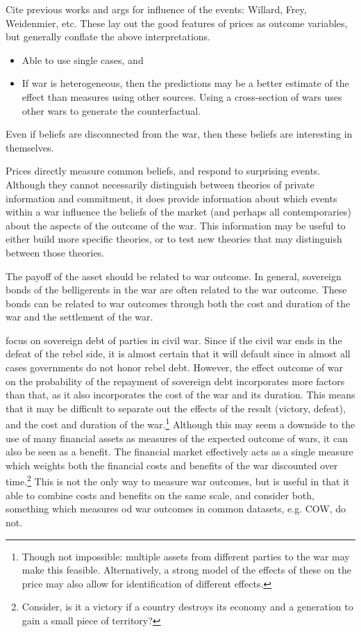 Cite previous works and args for influence of the events: Willard, Frey, Weidenmier, etc.
These lay out the good features of prices as outcome variables, but  generally conflate the above interpretations.

\begin{itemize}
\item Able to use single cases, and
\item If war is heterogeneous, then the predictions may be a better estimate of the effect than measures using other sources.
  Using a cross-section of wars uses other wars to generate the counterfactual.
\end{itemize}
Even if beliefs are disconnected from the war, then these beliefs are interesting in themselves.

Prices directly measure common beliefs, and respond to surprising events.
Although they cannot necessarily distinguish between theories of private information and commitment, it does provide information about which events within a war influence the beliefs of the market (and perhaps all contemporaries) about the aspects of the outcome of the war.
This information may be useful to either build more specific theories, or to test new theories that may distinguish between those theories.

The payoff of the asset should be related to war outcome.
In general, sovereign bonds of the belligerents in the war are often related to the war outcome.
These bonds can be related to war outcomes through both the cost and duration of the war and the settlement of the war.

\textcite{HaberMitchenerOosterlinckEtAl2015} focus on sovereign debt of parties in civil war.
Since if the civil war ends in the defeat of the rebel side, it is almost certain that it will default since in almost all cases governments do not honor rebel debt.
However, the effect outcome of war on the probability of the repayment of sovereign debt incorporates more factors than that, as it also incorporates the cost of the war and its duration.
This means that it may be difficult to separate out the effects of the result (victory, defeat), and the cost and duration of the war.\footnote{
  Though not impossible: multiple assets from different parties to the war may make this feasible.
  Alternatively, a strong model of the effects of these on the price may also allow for identification of different effects.
}
Although this may seem a downside to the use of many financial assets as measures of the expected outcome of wars, it can also be seen as a benefit.
The financial market effectively acts as a single measure which weights both the financial costs and benefits of the war discounted over time.\footnote{
  Consider, is it a victory if a country destroys its economy and a generation to gain a small piece of territory?
}
This is not the only way to measure war outcomes, but is useful in that it able to combine costs and benefits on the same scale, and consider both, something which measures od war outcomes in common datasets, e.g. COW, do not.

